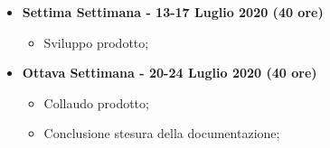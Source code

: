 {\begin{itemize}
\begin{itemize}
        \end{itemize}
        \item \textbf{Settima Settimana - 13-17 Luglio 2020 (40 ore)} 
        \begin{itemize}
            \item Sviluppo prodotto;
        \end{itemize}
        \item \textbf{Ottava Settimana - 20-24 Luglio 2020 (40 ore)} 
        \begin{itemize}
            \item Collaudo prodotto;
            \item Conclusione stesura della documentazione;
        \end{itemize}
    \end{itemize}
}

\newcommand{\totaleOre}{304}

\newcommand{\obiettiviObbligatori}{
	 \item \underline{\textit{O01}}: visualizzazione interattiva volumetrica;
	 \item \underline{\textit{O02}}: possibilità di scelta della funzione di trasferimento dei voxel (colore, trasparenza);
	 
}

\newcommand{\obiettiviDesiderabili}{
	 \item \underline{\textit{D01}}: piani di taglio del volume;
	 \item \underline{\textit{D02}}: modifiche alla funzione taglio;
	 \item \underline{\textit{D03}}: ottimizzazione rendering GPU;
}

\newcommand{\obiettiviFacoltativi}{
	 \item \underline{\textit{F01}}: algoritmi di segmentazione con ITK;
	 \item \underline{\textit{F02}}: analisi unit-testing su GUI-Qt;
	 \item \underline{\textit{F03}}: porting librerie aziendali su CMake;
}